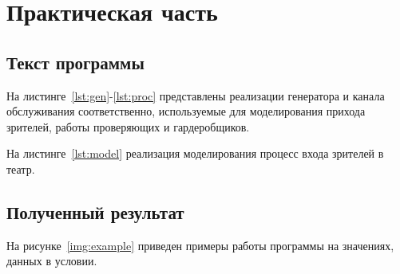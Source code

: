 \chapter{Практическая часть}

\section{Текст программы}

На листинге~\ref{lst:gen}-\ref{lst:proc} представлены реализации генератора и
канала обслуживания соответственно, используемые для моделирования прихода
зрителей, работы проверяющих и гардеробщиков.



На листинге~\ref{lst:model} реализация моделирования процесс входа зрителей в
театр. 


\clearpage
\section{Полученный результат}

На рисунке~\ref{img:example} приведен примеры работы программы на значениях,
данных в условии.

